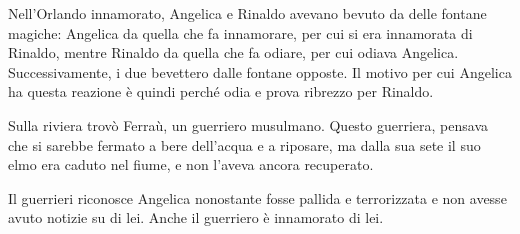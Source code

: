 \documentclass[a4paper]{article}
\begin{document}
Nell'Orlando innamorato, Angelica e Rinaldo avevano bevuto da delle fontane magiche:
Angelica da quella che fa innamorare, per cui si era innamorata di Rinaldo,
mentre Rinaldo da quella che fa odiare, per cui odiava Angelica.
Successivamente, i due bevettero dalle fontane opposte. Il motivo per cui
Angelica ha questa reazione è quindi perché odia e prova ribrezzo
per Rinaldo.

Sulla riviera trovò Ferraù, un guerriero musulmano.
Questo guerriera, pensava che si sarebbe fermato a bere dell'acqua e a riposare,
ma dalla sua sete il suo elmo era caduto nel fiume, e non l'aveva ancora
recuperato.

\begin{center} %
\begin{minipage}{0.5\textwidth}
\centering
{}
\end{minipage}
\end{center}

Il guerrieri riconosce Angelica nonostante fosse pallida 
e terrorizzata e non avesse avuto notizie su di lei.
Anche il guerriero è innamorato di lei.

\begin{center} %
\begin{minipage}{0.5\textwidth}
\centering
{}
\end{minipage}
\end{center}
\end{document}
